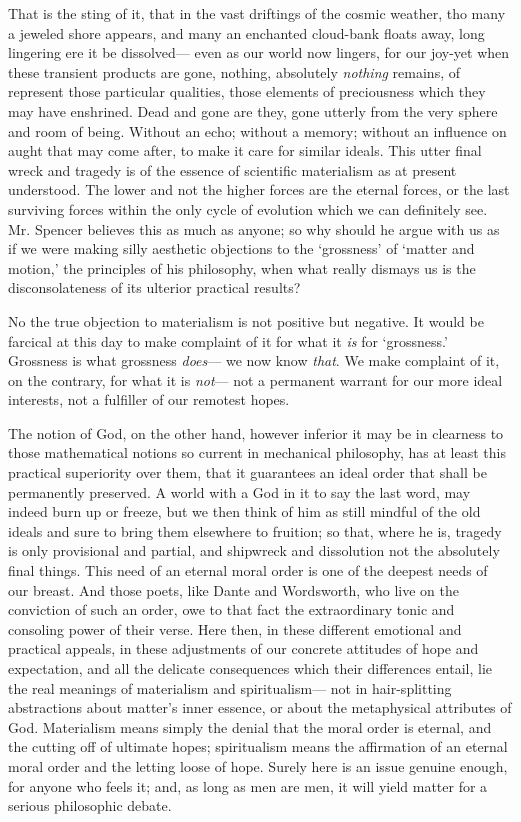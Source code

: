\documentclass[]{article}
\begin{document}
That is the sting of it, that in the vast driftings of the cosmic weather, tho many a jeweled shore appears, and many an enchanted cloud-bank floats away, long lingering ere it be dissolved--- even as our world now lingers, for our joy-yet when these transient products are gone, nothing, absolutely \emph{nothing} remains, of represent those particular qualities, those elements of preciousness which they may have enshrined. Dead and gone are they, gone utterly from the very sphere and room of being. Without an echo; without a memory; without an influence on aught that may come after, to make it care for similar ideals. This utter final wreck and tragedy is of the essence of scientific materialism as at present understood. The lower and not the higher forces are the eternal forces, or the last surviving forces within the only cycle of evolution which we can definitely see. Mr. Spencer believes this as much as anyone; so why should he argue with us as if we were making silly aesthetic objections to the `grossness' of `matter and motion,' the principles of his philosophy, when what really dismays us is the disconsolateness of its ulterior practical results?

No the true objection to materialism is not positive but negative. It would be farcical at this day to make complaint of it for what it \emph{is} for `grossness.' Grossness is what grossness \emph{does}--- we now know \emph{that}. We make complaint of it, on the contrary, for what it is \emph{not}--- not a permanent warrant for our more ideal interests, not a fulfiller of our remotest hopes.

The notion of God, on the other hand, however inferior it may be in clearness to those mathematical notions so current in mechanical philosophy, has at least this practical superiority over them, that it guarantees an ideal order that shall be permanently preserved. A world with a God in it to say the last word, may indeed burn up or freeze, but we then think of him as still mindful of the old ideals and sure to bring them elsewhere to fruition; so that, where he is, tragedy is only provisional and partial, and shipwreck and dissolution not the absolutely final things. This need of an eternal moral order is one of the deepest needs of our breast. And those poets, like Dante and Wordsworth, who live on the conviction of such an order, owe to that fact the extraordinary tonic and consoling power of their verse. Here then, in these different emotional and practical appeals, in these adjustments of our concrete attitudes of hope and expectation, and all the delicate consequences which their differences entail, lie the real meanings of materialism and spiritualism--- not in hair-splitting abstractions about matter's inner essence, or about the metaphysical attributes of God. Materialism means simply the denial that the moral order is eternal, and the cutting off of ultimate hopes; spiritualism means the affirmation of an eternal moral order and the letting loose of hope. Surely here is an issue genuine enough, for anyone who feels it; and, as long as men are men, it will yield matter for a serious philosophic debate.
\end{document}

